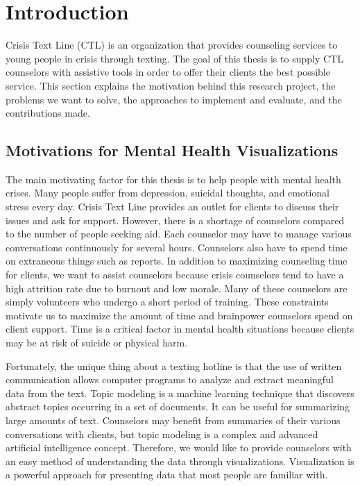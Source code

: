 \chapter{Introduction}

Crisis Text Line (CTL) \cite{ctl} is an organization that provides counseling services to
young people in crisis through texting. The goal of this thesis is to supply CTL
counselors with assistive tools in order to offer their clients the best possible service.
This section explains the motivation behind this research project, the problems we
want to solve, the approaches to implement and evaluate, and the contributions made.

\section{Motivations for Mental Health Visualizations}

The main motivating factor for this thesis is to help people with mental health crises.
Many people suffer from depression, suicidal thoughts, and emotional stress every
day. Crisis Text Line provides an outlet for clients to discuss their issues and ask for
support. However, there is a shortage of counselors compared to the number of people
seeking aid. Each counselor may have to manage various conversations continuously
for several hours. Counselors also have to spend time on extraneous things such as
reports. In addition to maximizing counseling time for clients, we want to assist
counselors because crisis counselors tend to have a high attrition rate due to burnout
and low morale. Many of these counselors are simply volunteers who undergo a short
period of training. These constraints motivate us to maximize the amount of time
and brainpower counselors spend on client support. Time is a critical factor in mental
health situations because clients may be at risk of suicide or physical harm.

Fortunately, the unique thing about a texting hotline is that the use of written
communication allows computer programs to analyze and extract meaningful data
from the text. Topic modeling is a machine learning technique that discovers abstract
topics occurring in a set of documents. It can be useful for summarizing large amounts
of text. Counselors may benefit from summaries of their various conversations with
clients, but topic modeling is a complex and advanced artificial intelligence concept.
Therefore, we would like to provide counselors with an easy method of understanding
the data through visualizations. Visualization is a powerful approach for presenting
data that most people are familiar with.

